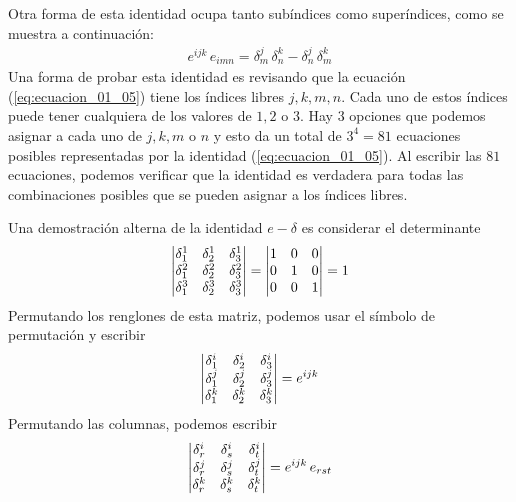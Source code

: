 \documentclass[hidelinks,12pt]{article}
\begin{document}
Otra forma de esta identidad ocupa tanto subíndices como superíndices, como se muestra a continuación:
\begin{align}
e^{ijk} \, e_{imn} = \delta_{m}^{j} \, \delta_{n}^{k} - \delta_{n}^{j} \, \delta_{m}^{k}
\label{eq:ecuacion_01_05}
\end{align}
Una forma de probar esta identidad es revisando que la ecuación (\ref{eq:ecuacion_01_05}) tiene los índices libres $j, k, m, n$. Cada uno de estos índices puede tener cualquiera de los valores de $1, 2$ o $3$. Hay $3$ opciones que podemos asignar a cada uno de $j, k, m$ o $n$ y esto da un total de $3^{4} = 81$ ecuaciones posibles representadas por la identidad (\ref{eq:ecuacion_01_05}). Al escribir las $81$ ecuaciones, podemos verificar que la identidad es verdadera para todas las combinaciones posibles que se pueden asignar a los índices libres.
\par
Una demostración alterna de la identidad $e-\delta$ es considerar el determinante
\begin{align*}
    \mqty|
        \delta_{1}^{1} & \delta_{2}^{1} & \delta_{3}^{1} \\
        \delta_{1}^{2} & \delta_{2}^{2} & \delta_{3}^{2} \\
        \delta_{1}^{3} & \delta_{2}^{3} & \delta_{3}^{3} \\
    | =
    \mqty|
        1 & 0 & 0 \\
        0 & 1 & 0 \\
        0 & 0 & 1
    | = 1
\end{align*}
Permutando los renglones de esta matriz, podemos usar el símbolo de permutación y escribir
\begin{align*}
    \mqty|
        \delta_{1}^{i} & \delta_{2}^{i} & \delta_{3}^{i} \\
        \delta_{1}^{j} & \delta_{2}^{j} & \delta_{3}^{j} \\
        \delta_{1}^{k} & \delta_{2}^{k} & \delta_{3}^{k} \\
    | = e^{ijk}
\end{align*}
Permutando las columnas, podemos escribir
\begin{align*}
    \mqty|
        \delta_{r}^{i} & \delta_{s}^{i} & \delta_{t}^{i} \\
        \delta_{r}^{j} & \delta_{s}^{j} & \delta_{t}^{j} \\
        \delta_{r}^{k} & \delta_{s}^{k} & \delta_{t}^{k} \\
    | = e^{ijk} \, e_{rst}
\end{align*}
\end{document}
